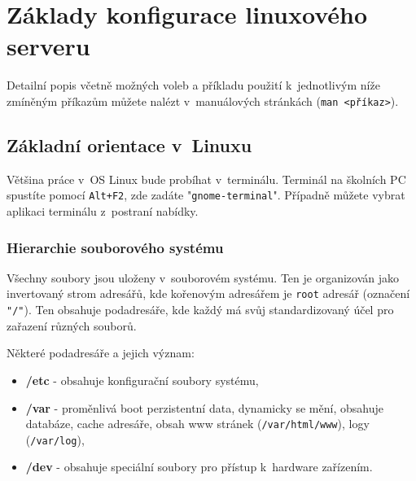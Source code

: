 
\section{Základy konfigurace linuxového serveru}
\label{basics}

Detailní popis včetně možných voleb a příkladu použití k~jednotlivým níže zmíněným příkazům můžete nalézt v~manuálových stránkách (\texttt{man <příkaz>}).
\subsection{Základní orientace v~Linuxu}
Většina práce v~OS Linux bude probíhat v~terminálu. Terminál na školních PC spustíte pomocí \texttt{Alt+F2}, zde zadáte "\texttt{gnome-terminal}". Případně můžete vybrat aplikaci terminálu z~postraní nabídky.
\subsubsection{Hierarchie souborového systému}
Všechny soubory jsou uloženy v~souborovém systému. Ten je organizován jako invertovaný strom adresářů,
kde kořenovým adresářem je \texttt{root} adresář (označení \texttt{"/"}). Ten obsahuje podadresáře,
kde každý má svůj standardizovaný účel pro zařazení různých souborů.

Některé podadresáře a jejich význam:
\begin{itemize}
				\item \textbf{/etc} - obsahuje konfigurační soubory systému,
				\item \textbf{/var} - proměnlivá boot perzistentní data, dynamicky se mění, obsahuje databáze, cache adresáře, obsah www stránek (\texttt{/var/html/www}), logy (\texttt{/var/log}),
				\item \textbf{/dev} - obsahuje speciální soubory pro přístup k~hardware zařízením.
\end{itemize}

